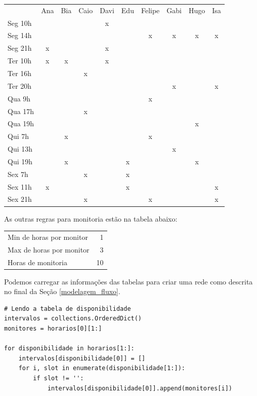 \documentclass[11pt]{article}
\begin{document}
\begin{center}
\begin{tabular}{lccccccccc}
 & Ana & Bia & Caio & Davi & Edu & Felipe & Gabi & Hugo & Isa\\
Seg 10h &  &  &  & x &  &  &  &  & \\
Seg 14h &  &  &  &  &  & x & x & x & x\\
Seg 21h & x &  &  & x &  &  &  &  & \\
Ter 10h & x & x &  & x &  &  &  &  & \\
Ter 16h &  &  & x &  &  &  &  &  & \\
Ter 20h &  &  &  &  &  &  & x &  & x\\
Qua 9h &  &  &  &  &  & x &  &  & \\
Qua 17h &  &  & x &  &  &  &  &  & \\
Qua 19h &  &  &  &  &  &  &  & x & \\
Qui 7h &  & x &  &  &  & x &  &  & \\
Qui 13h &  &  &  &  &  &  & x &  & \\
Qui 19h &  & x &  &  & x &  &  & x & \\
Sex 7h &  &  & x &  & x &  &  &  & \\
Sex 11h & x &  &  &  & x &  &  &  & x\\
Sex 21h &  &  & x &  &  & x &  &  & x\\
\end{tabular}
\end{center}
As outras regras para monitoria estão na tabela abaixo:

\begin{center}
\begin{tabular}{lr}
Min de horas por monitor & 1\\
Max de horas por monitor & 3\\
Horas de monitoria & 10\\
\end{tabular}
\end{center}

Podemos carregar as informações das tabelas para criar uma rede como
descrita no final da Seção \ref{modelagem_fluxo}.
\begin{verbatim}
# Lendo a tabela de disponibilidade
intervalos = collections.OrderedDict()
monitores = horarios[0][1:]

for disponibilidade in horarios[1:]:
    intervalos[disponibilidade[0]] = []
    for i, slot in enumerate(disponibilidade[1:]):
        if slot != '':
            intervalos[disponibilidade[0]].append(monitores[i])
\end{verbatim}
\end{document}
